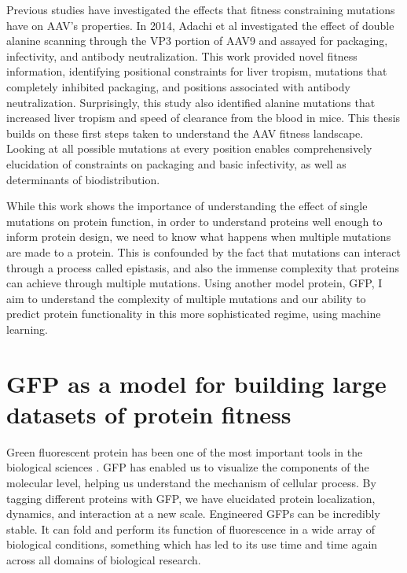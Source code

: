 Previous studies have investigated the effects that fitness constraining mutations have on AAV’s properties. In 2014, Adachi et al investigated the effect of double alanine scanning through the VP3 portion of AAV9 and assayed for packaging, infectivity, and antibody neutralization\cite{Adachi2014-sw}. This work provided novel fitness information, identifying positional constraints for liver tropism, mutations that completely inhibited packaging, and positions associated with antibody neutralization. Surprisingly, this study also identified alanine mutations that increased liver tropism and speed of clearance from the blood in mice. This thesis builds on these first steps taken to understand the AAV fitness landscape. Looking at all possible mutations at every position enables comprehensively elucidation of constraints on packaging and basic infectivity, as well as determinants of biodistribution. 

While this work shows the importance of understanding the effect of single mutations on protein function, in order to understand proteins well enough to inform protein design, we need to know what happens when multiple mutations are made to a protein. This is confounded by the fact that mutations can interact through a process called epistasis\cite{Poelwijk2016-sj},  and also the immense complexity that proteins can achieve through multiple mutations. Using another model protein, GFP, I aim to understand the complexity of multiple mutations and our ability to predict protein functionality in this more sophisticated regime, using machine learning.

\section{GFP as a model for building large datasets of protein fitness}

Green fluorescent protein has been one of the most important tools in the biological sciences  \cite{Prasher1992-cn,Chalfie1994-lb,Crameri1996-wk}. GFP has enabled us to visualize the components of the molecular level, helping us understand the mechanism of cellular process. By tagging different proteins with GFP, we have elucidated protein localization, dynamics, and interaction at a new scale. Engineered GFPs can be incredibly stable\cite{Pedelacq2006-cj}. It can fold and perform its function of fluorescence in a wide array of biological conditions, something which has led to its use time and time again across all domains of biological research.

